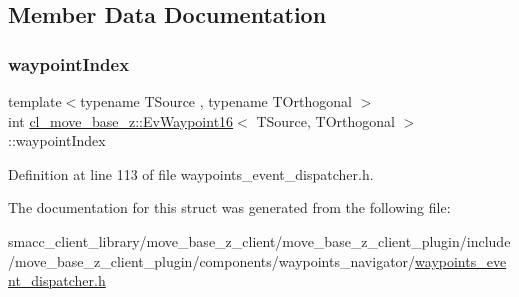 \subsection{Member Data Documentation}
\mbox{\label{structcl__move__base__z_1_1EvWaypoint16_ab6d126c7c04f63d61a12a4fb160637f1}} 
\subsubsection{\texorpdfstring{waypoint\+Index}{waypointIndex}}
{\footnotesize\ttfamily template$<$typename T\+Source , typename T\+Orthogonal $>$ \\
int \hyperlink{structcl__move__base__z_1_1EvWaypoint16}{cl\+\_\+move\+\_\+base\+\_\+z\+::\+Ev\+Waypoint16}$<$ T\+Source, T\+Orthogonal $>$\+::waypoint\+Index}



Definition at line 113 of file waypoints\+\_\+event\+\_\+dispatcher.\+h.



The documentation for this struct was generated from the following file\+:\begin{DoxyCompactItemize}
\item 
smacc\+\_\+client\+\_\+library/move\+\_\+base\+\_\+z\+\_\+client/move\+\_\+base\+\_\+z\+\_\+client\+\_\+plugin/include/move\+\_\+base\+\_\+z\+\_\+client\+\_\+plugin/components/waypoints\+\_\+navigator/\hyperlink{waypoints__event__dispatcher_8h}{waypoints\+\_\+event\+\_\+dispatcher.\+h}\end{DoxyCompactItemize}
